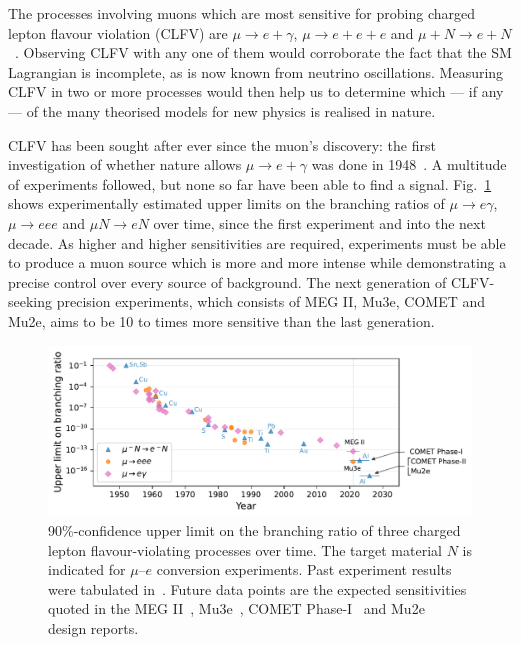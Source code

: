 The processes involving muons which are most sensitive for probing charged
lepton flavour violation (CLFV) are ${\mu \rightarrow e + \gamma}$, ${\mu
\rightarrow e+e+e}$ and ${\mu + N \rightarrow e + N}$~\cite{BERNSTEIN201327}.
Observing CLFV with any one of them would corroborate the fact that the SM
Lagrangian is incomplete, as is now known from neutrino oscillations. Measuring
CLFV in two or more processes would then help us to determine which --- if any
--- of the many theorised models for new physics is realised in nature.


CLFV has been sought after ever since the muon's discovery: the first
investigation of whether nature allows $\mu \rightarrow e + \gamma$ was done in
1948~\cite{PhysRev.73.257}. A multitude of experiments followed, but none so far
have been able to find a signal. Fig.~\ref{fig:clfv_upper_limit} shows
experimentally estimated upper limits on the branching ratios of $\mu
\rightarrow e\gamma$, $\mu\rightarrow eee$ and $\mu N \rightarrow e N$ over
time, since the first experiment and into the next decade. As
higher and higher sensitivities are required, experiments must be able to
produce a muon source which is more and more intense while demonstrating a
precise control over every source of background. The next generation of
CLFV-seeking precision experiments, which consists of MEG II, Mu3e, COMET and
Mu2e, aims to be 10 to  times more sensitive than the last
generation.

\begin{figure}
    \centering
    \includegraphics[width=\textwidth]{chapter1/clfv_upper_limit_v2.pdf}
    \caption{
        90\%-confidence upper limit on the branching ratio of three charged
        lepton flavour-violating processes over time. 
        The target material $N$ is indicated for $\mu$--$e$ conversion experiments.
        Past experiment results
        were tabulated in~\cite{BERNSTEIN201327}. Future data points are the
        expected sensitivities quoted in the MEG II~\cite{Baldini2018},
        Mu3e~\cite{ARNDT2021165679}, COMET
        Phase-I~\cite{the_comet_collaboration_comet_2020} and
        Mu2e~\cite{bartoszek2015mu2e} design reports.
    }
    \label{fig:clfv_upper_limit}
\end{figure}

